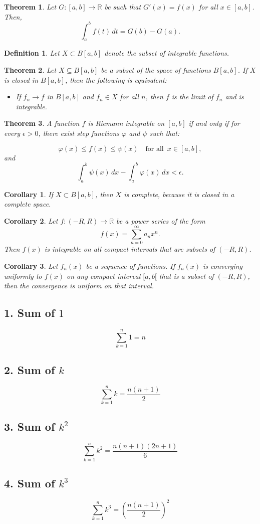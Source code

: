 \documentclass{article}
\newtheorem{definition}{Definition}
\newtheorem{theorem}{Theorem}
\newtheorem{corollary}{Corollary}
\begin{document}
\begin{theorem}
Let \( G : [a, b] \to \mathbb{R} \) be such that \( G'(x) = f(x) \) for all \( x \in [a, b] \). Then,
\[
\int_a^b f(t) \, dt = G(b) - G(a).
\]
\end{theorem}
\begin{definition}
Let \( X \subset B[a, b] \) denote the subset of integrable functions.
\end{definition}
\begin{theorem}
Let \( X \subseteq B[a,b] \) be a subset of the space of functions \( B[a,b] \). If \( X \) is closed in \( B[a,b] \), then the following is equivalent:
\begin{itemize}
    \item If \( f_n \to f \) in \( B[a,b] \) and \( f_n \in X \) for all \( n \), then \( f \) is the limit of \( f_n \) and is integrable.
\end{itemize}
\end{theorem}
\begin{theorem}
A function \( f \) is Riemann integrable on \( [a,b] \) if and only if for every \( \epsilon > 0 \), there exist step functions \( \varphi \) and \( \psi \) such that:

\[
\varphi(x) \leq f(x) \leq \psi(x) \quad \text{for all } \, x \in [a,b],
\]
and
\[
\int_a^b \psi(x) \, dx - \int_a^b \varphi(x) \, dx < \epsilon.
\]
\end{theorem}
\begin{corollary}
If \( X \subset B[a,b] \), then \( X \) is complete, because it is closed in a complete space.
\end{corollary}
\begin{corollary}
Let \( f : (-R, R) \to \mathbb{R} \) be a power series of the form
\[
f(x) = \sum_{n=0}^{\infty} a_n x^n.
\]
Then \( f(x) \) is integrable on all compact intervals that are subsets of \( (-R, R) \).
\end{corollary}
\begin{corollary}
Let \( f_n(x) \) be a sequence of functions. If \( f_n(x) \) is converging uniformly to \( f(x) \) on any compact interval \( [a,b[ \) that is a subset of \( (-R, R) \), then the convergence is uniform on that interval.
\end{corollary}
\subsection*{1. Sum of \( 1 \)}
\[
\sum_{k=1}^n 1 = n
\]
\subsection*{2. Sum of \( k \)}
\[
\sum_{k=1}^n k = \frac{n(n+1)}{2}
\]
\subsection*{3. Sum of \( k^2 \)}
\[
\sum_{k=1}^n k^2 = \frac{n(n+1)(2n+1)}{6}
\]
\subsection*{4. Sum of \( k^3 \)}
\[
\sum_{k=1}^n k^3 = \left( \frac{n(n+1)}{2} \right)^2
\]
\end{document}
